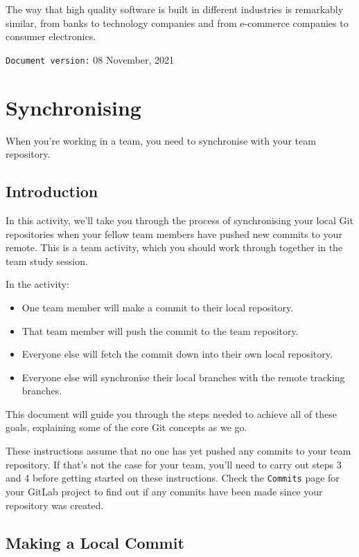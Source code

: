 \documentclass[
]{book}
\providecommand{\tightlist}{%
  \setlength{\itemsep}{0pt}\setlength{\parskip}{0pt}}
\begin{document}
The way that high quality software is built in different industries is remarkably similar, from banks to technology companies and from e-commerce companies to consumer electronics.

\texttt{Document\ version:} 08 November, 2021

\hypertarget{syncing}{%
\chapter{Synchronising}\label{syncing}}

When you're working in a team, you need to synchronise with your team repository.

\hypertarget{syncintro}{%
\section{Introduction}\label{syncintro}}

In this activity, we'll take you through the process of synchronising your local Git repositories when your fellow team members have pushed new commits to your remote. This is a team activity, which you should work through together in the team study session.

In the activity:

\begin{itemize}
\tightlist
\item
  One team member will make a commit to their local repository.
\item
  That team member will push the commit to the team repository.
\item
  Everyone else will fetch the commit down into their own local repository.
\item
  Everyone else will synchronise their local branches with the remote tracking branches.
\end{itemize}

This document will guide you through the steps needed to achieve all of these goals, explaining some of the core Git concepts as we go.

These instructions assume that no one has yet pushed any commits to your team repository. If that's not the case for your team, you'll need to carry out steps 3 and 4 before getting started on these instructions. Check the \texttt{Commits} page for your GitLab project to find out if any commits have been made since your repository was created.

\hypertarget{locommit}{%
\section{Making a Local Commit}\label{locommit}}
\end{document}
